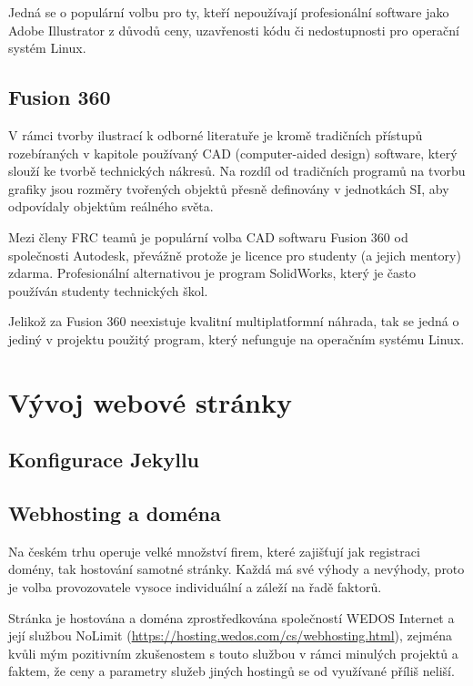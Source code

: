 \documentclass[a4paper, 12pt]{article}
\begin{document}
  Jedná se o populární volbu pro ty, kteří nepoužívají profesionální software jako Adobe Illustrator z důvodů ceny, uzavřenosti kódu či nedostupnosti pro operační systém Linux\cite{illustrator-pricing}.


  \subsection{Fusion 360} \label{sec:Fusion 360}
  V rámci tvorby ilustrací k odborné literatuře je kromě tradičních přístupů rozebíraných v kapitole používaný CAD (computer-aided design) software, který slouží ke tvorbě technických nákresů. Na rozdíl od tradičních programů na tvorbu grafiky jsou rozměry tvořených objektů přesně definovány v jednotkách SI, aby odpovídaly objektům reálného světa.

  Mezi členy FRC teamů je populární volba CAD softwaru Fusion 360 od společnosti Autodesk, převážně protože je licence pro studenty (a jejich mentory) zdarma\cite{fusion-360-pricing}. Profesionální alternativou je program SolidWorks, který je často používán studenty technických škol.

  Jelikož za Fusion 360 neexistuje kvalitní multiplatformní náhrada, tak se jedná o jediný v projektu použitý program, který nefunguje na operačním systému Linux.

  \section{Vývoj webové stránky}

  \subsection{Konfigurace Jekyllu}

  \subsection{Webhosting a doména} \label{sec:Webhosting a doména}
  Na českém trhu operuje velké množství firem, které zajišťují jak registraci domény, tak hostování samotné stránky. Každá má své výhody a nevýhody, proto je volba provozovatele vysoce individuální a záleží na řadě faktorů.

  Stránka je hostována a doména zprostředkována společností WEDOS Internet a její službou NoLimit (\url{https://hosting.wedos.com/cs/webhosting.html}), zejména kvůli mým pozitivním zkušenostem s touto službou v rámci minulých projektů a faktem, že ceny a parametry služeb jiných hostingů se od využívané příliš neliší.
\end{document}

